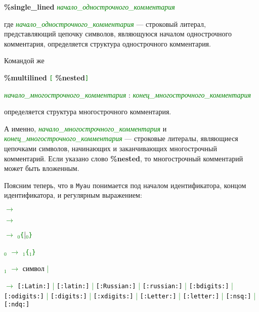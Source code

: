 \documentclass[10pt]{report}
\begin{document}
{\noindent%
\textbf{\%single_lined} \textcolor{Green}{\textit{начало_однострочного_комментария}}
}

\noindent%
где \textcolor{Green}{\textit{начало_однострочного_комментария}} --- строковый литерал, представляющий цепочку символов, являющуюся началом однострочного
комментария, определяется структура однострочного комментария.

Командой же

{\noindent%
\textbf{\%multilined} \texttt{\textcolor{Green}{[}}%
\textbf{\%nested}\texttt{\textcolor{Green}{]}}

\textcolor{Green}{\textit{начало_многострочного_комментария}} :
\textcolor{Green}{\textit{конец_многострочного_комментария}}
}

\noindent%
определяется структура многострочного комментария. 

А именно, \textcolor{Green}{\textit{начало_многострочного_комментария}} и \textcolor{Green}{\textit{конец_многострочного_комментария}} --- строковые литералы, являющиеся
цепочками символов, начинающих и заканчивающих многострочный комментарий. Если указано слово \textbf{\%nested}, то многострочный комментарий может быть вложенным.

Поясним теперь, что в \texttt{Myau} понимается под началом идентификатора, концом идентификатора, и регулярным выражением:

\textcolor{Green}{ $\to$ }\textcolor{Green}{}

\textcolor{Green}{ $\to$ }\textcolor{Green}{}

\textcolor{Green}{ $\to$ $_0$\texttt{\{}\textcolor{Black}{|}$_0$\texttt{\}}}

\textcolor{Green}{$_0$ $\to$ $_1$\texttt{\{}$_1$\texttt{\}}}


\textcolor{Green}{$_1$ $\to$ \textcolor{Black}{символ} | }

\textcolor{Green}{ $\to$ \texttt{\textcolor{Black}{[:Latin:]}} | \texttt{\textcolor{Black}{[:latin:]}} | \texttt{\textcolor{Black}{[:Russian:]}} |
\texttt{\textcolor{Black}{[:russian:]}} | \texttt{\textcolor{Black}{[:bdigits:]}} |\\
{}\texttt{\textcolor{Black}{[:odigits:]}} | \texttt{\textcolor{Black}{[:digits:]}} | \texttt{\textcolor{Black}{[:xdigits:]}} | \texttt{\textcolor{Black}{[:Letter:]}} |
\texttt{\textcolor{Black}{[:letter:]}} | \texttt{\textcolor{Black}{[:nsq:]}} | \texttt{\textcolor{Black}{[:ndq:]}} }
\end{document}
